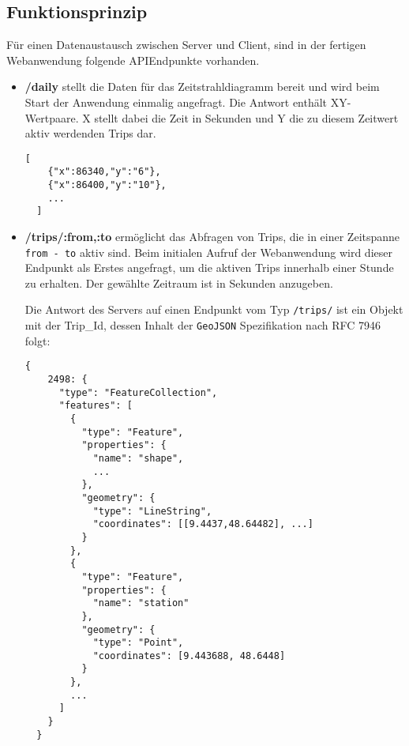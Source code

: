 \subsection{Funktionsprinzip}
\label{sub:funktionsprinzip}
    Für einen Datenaustausch zwischen Server und Client, sind in der fertigen Webanwendung folgende API\footnotemark Endpunkte vorhanden. 


    \begin{itemize}
      \item \textbf{/daily} stellt die Daten für das Zeitstrahldiagramm bereit und wird beim Start der Anwendung einmalig angefragt. Die Antwort enthält XY-Wertpaare. X stellt dabei die Zeit in Sekunden und Y die zu diesem Zeitwert aktiv werdenden Trips dar.

  \begin{lstlisting}[captionpos=t, caption=Antwort des Servers zur Anfrage \texttt{/daily}, label=lst:daily_response]
  [
    {"x":86340,"y":"6"},
    {"x":86400,"y":"10"}, 
    ...
  ]
  \end{lstlisting}

      \item \textbf{/trips/:from,:to} ermöglicht das Abfragen von Trips, die in einer Zeitspanne \texttt{from - to} aktiv sind. Beim initialen Aufruf der Webanwendung wird dieser Endpunkt als Erstes angefragt, um die aktiven Trips innerhalb einer Stunde zu erhalten. Der gewählte Zeitraum ist in Sekunden anzugeben. 

      Die Antwort des Servers auf einen Endpunkt vom Typ \texttt{/trips/} ist ein Objekt mit der Trip\_Id, dessen Inhalt der \texttt{GeoJSON} Spezifikation nach RFC 7946 folgt:

  \begin{lstlisting}[captionpos=t, caption=Trip Objekt, label=lst:trip_object]
  {
    2498: {  
      "type": "FeatureCollection",
      "features": [
        {
          "type": "Feature",
          "properties": {
            "name": "shape",
            ...
          },
          "geometry": {
            "type": "LineString",
            "coordinates": [[9.4437,48.64482], ...]
          }
        },
        {
          "type": "Feature",
          "properties": {
            "name": "station"
          },
          "geometry": {
            "type": "Point",
            "coordinates": [9.443688, 48.6448]
          }
        },
        ...
      ]
    }
  }
  \end{lstlisting}
    

\end{itemize}
